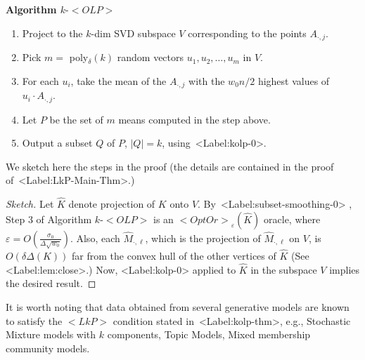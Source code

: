 \documentclass[11pt,letterpaper]{article}
\newcounter{note}[section]
\def\mathsf#1{<#1>}%
\def\xspace{}%
\def\Cref#1{<Label:#1>}%
\theoremstyle{definition}
\theoremstyle{remark}
\newcommand{\hatM}{{\widehat M}}
\newcommand{\hatK}{{\widehat K}}
\newcommand{\lkp}{{\mathsf {LkP}}\xspace}
\newcommand{\olp}{{\mathsf {OLP}}\xspace}
\newcommand{\kolp}{k\mbox{-}\olp}
\newcommand{\hMdot}[1]{{\hatM_{\cdot, #1}}}
\newcommand{\Adot}[1]{{A_{\cdot, #1}}}
\newcommand{\opto}{{\mathsf{OptOr}}}
\begin{document}
\begin{framed}

{\bf Algorithm $\kolp$}

\begin{enumerate}
\item Project to the $k$-dim SVD subspace $V$ corresponding to the points $\Adot{j}$.
\item Pick $m=$ poly$_\delta(k)$ random vectors $u_1,u_2,\ldots ,u_m$ in $V$.
\item For each $u_i$, take the mean of the $A_{\cdot,j}$ with the $w_0n/2$ highest values of $u_i\cdot A_{\cdot,j}$. 
\item Let $P$ be the  set of $m$ means computed in the step above.
\item Output a subset $Q$ of $P$, $|Q| = k$, using~\Cref{kolp-0}. 
\end{enumerate}
\end{framed}

We sketch here the steps in the proof (the details are contained in the proof of~\Cref{LkP-Main-Thm}.) 

\begin{proof} [Sketch]
Let $\hatK$ denote projection of $K$ onto $V$. By~\Cref{subset-smoothing-0}   , Step 3 of Algorithm $\kolp$ is an    $\opto_\varepsilon(\hatK)$ oracle, where $\varepsilon = {O\left(\frac{\sigma_0}{\Delta \sqrt{w_0}}\right)}$. Also, each $\hMdot{\ell}$, which is the projection of $\hMdot{\ell}$ on $V$, is $O(\delta\Delta(K))$ far from the convex hull of the other vertices of $\hatK$ (See \Cref{lem:close}.) Now, \Cref{kolp-0} applied  to $\hatK$ in the subspace $V$ implies the desired result. 
\end{proof}

It is worth noting that data obtained from several generative models are known to satisfy the $\lkp$ condition stated in~\Cref{kolp-thm}, e.g.,  Stochastic Mixture models with $k$ components, Topic Models, Mixed membership community models. 
\end{document}
